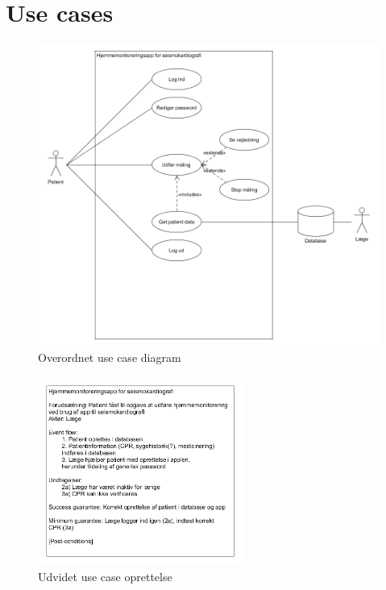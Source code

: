 \section{Use cases}



\begin{figure}[H]
\centering
  \includegraphics[width=1.1\textwidth]{Billeder/app}
   \caption{Overordnet use case diagram} 
   \label{...}
\end{figure}

\begin{figure}[H]
\centering
  \includegraphics[width=0.6\textwidth]{Billeder/oprettelse.png}
   \caption{Udvidet use case oprettelse} 
   \label{fig:hjerte}
\end{figure}



